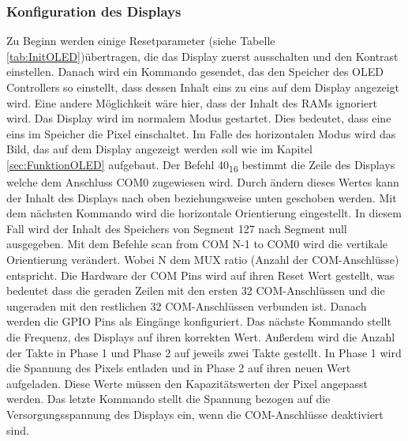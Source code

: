 \subsubsection{Konfiguration des Displays}
Zu Beginn werden einige Resetparameter (siehe Tabelle \ref{tab:InitOLED})übertragen, die das Display zuerst ausschalten und den Kontrast einstellen. Danach wird ein Kommando gesendet, das den Speicher des \ac{OLED} Controllers so einstellt, dass dessen Inhalt eins zu eins auf dem Display angezeigt wird. Eine andere Möglichkeit wäre hier, dass der Inhalt des \ac{RAM}s ignoriert wird. Das Display wird im normalem Modus gestartet. Dies bedeutet, dass eine eins im Speicher die Pixel einschaltet. Im Falle des horizontalen Modus wird das Bild, das auf dem Display angezeigt werden soll wie im Kapitel \ref{sec:FunktionOLED} aufgebaut. Der Befehl 40\textsubscript{16} bestimmt die Zeile des Displays welche dem Anschluss COM0 zugewiesen wird. Durch ändern dieses Wertes kann der Inhalt des Displays nach oben beziehungsweise unten geschoben werden. Mit dem nächsten Kommando wird die horizontale Orientierung eingestellt. In diesem Fall wird der Inhalt des Speichers von Segment 127 nach Segment null ausgegeben. Mit dem Befehle \glqq scan from COM N-1 to COM0\grqq{} wird die vertikale Orientierung verändert. Wobei N dem \glqq MUX ratio\grqq{} (Anzahl der COM-Anschlüsse) entspricht. Die Hardware der COM Pins wird auf ihren Reset Wert gestellt, was bedeutet dass die geraden Zeilen mit den ersten 32 COM-Anschlüssen und die ungeraden mit den restlichen 32 COM-Anschlüssen verbunden ist. Danach werden die GPIO Pins als Eingänge konfiguriert. Das nächste Kommando stellt die Frequenz, des Displays auf ihren korrekten Wert. Außerdem wird die Anzahl der Takte in Phase 1 und Phase 2 auf jeweils zwei Takte gestellt. In Phase 1 wird die Spannung des Pixels entladen und in Phase 2 auf ihren neuen Wert aufgeladen. Diese Werte müssen den Kapazitätswerten der Pixel angepasst werden. Das letzte Kommando stellt die Spannung bezogen auf die Versorgungsspannung des Displays ein, wenn die COM-Anschlüsse deaktiviert sind.
